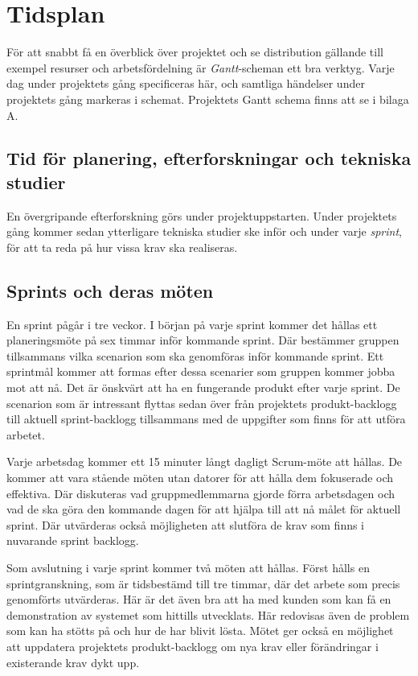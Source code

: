 \documentclass[a4paper,12pt,oneside,final]{extbook}
\begin{document}
\chapter{Tidsplan}

För att snabbt få en överblick över projektet och se distribution
gällande till exempel resurser och arbetsfördelning är \emph{Gantt}-scheman
ett bra verktyg. Varje dag under projektets gång specificeras här,
och samtliga händelser under projektets gång markeras i schemat.
Projektets Gantt schema finns att se i bilaga A.

\section{Tid för planering, efterforskningar och tekniska studier}
En övergripande efterforskning görs under projektuppstarten. Under
projektets gång kommer sedan ytterligare tekniska studier ske inför
och under varje \emph{sprint}, för att ta reda på hur vissa krav ska realiseras.

\section{Sprints och deras möten}
\label{sprintomoten}
En sprint pågår i tre veckor. I början på varje sprint kommer det
hållas ett planeringsmöte på sex timmar inför kommande sprint. Där
bestämmer gruppen tillsammans vilka scenarion som ska genomföras inför
kommande sprint. Ett sprintmål kommer att formas efter dessa
scenarier som gruppen kommer jobba mot att nå. Det är önskvärt
att ha en fungerande produkt efter varje sprint. De scenarion som
är intressant flyttas sedan över från projektets produkt-backlogg
till aktuell sprint-backlogg tillsammans med de uppgifter som finns
för att utföra arbetet.

Varje arbetsdag kommer ett 15 minuter långt dagligt Scrum-möte att hållas.
De kommer att vara stående möten utan datorer för att hålla dem
fokuserade och effektiva. Där diskuteras vad gruppmedlemmarna
gjorde förra arbetsdagen och vad de ska göra den kommande dagen
för att hjälpa till att nå målet för aktuell sprint. Där utvärderas
också möjligheten att slutföra de krav som finns i nuvarande
sprint backlogg.

Som avslutning i varje sprint kommer två möten att hållas. Först
hålls en sprintgranskning, som är tidsbestämd till tre timmar, där
det arbete som precis genomförts utvärderas. Här är det även bra
att ha med kunden som kan få en demonstration av systemet som
hittills utvecklats. Här redovisas även de problem som kan ha
stötts på och hur de har blivit lösta. Mötet ger också en möjlighet
att uppdatera projektets produkt-backlogg om nya krav eller
förändringar i existerande krav dykt upp.
\end{document}
